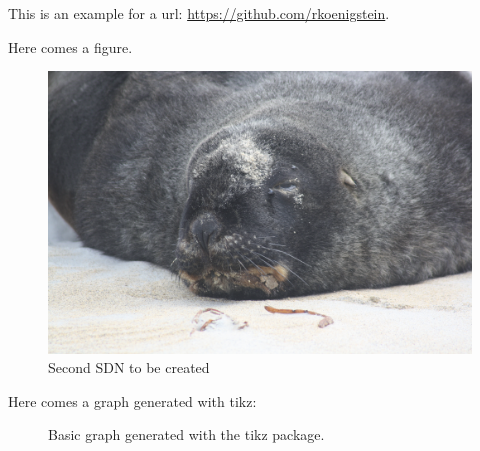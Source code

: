 \documentclass[a4paper]{article}
\begin{document}
This is an example for a url:  \url{https://github.com/rkoenigstein}.\clearpage

Here comes a figure.\newline

\begin{figure}[htbp]
	\centering
	\includegraphics[width=1\textwidth]{sealion.jpg}
	\caption{Second SDN to be created}
	\label{fig:image}
\end{figure}

Here comes a graph generated with tikz:\newline

\begin{figure}[htbp]
  \centering
  \caption{Basic graph generated with the tikz package.}
  \label{fig:tikz_graph}
\end{figure}
\end{document}

